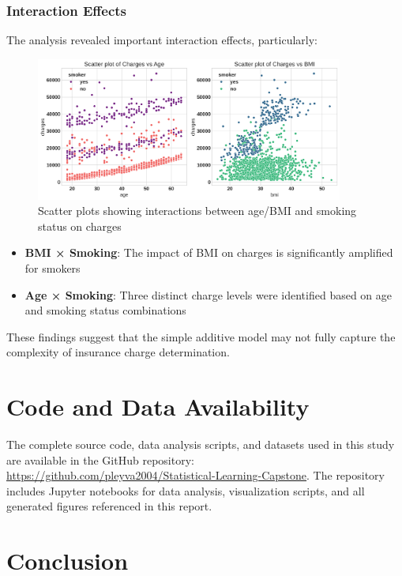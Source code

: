 \documentclass[12pt,a4paper]{article}
\begin{document}
\subsubsection{Interaction Effects}

The analysis revealed important interaction effects, particularly:

\begin{figure}[H]
\centering
\includegraphics[width=0.9\textwidth]{scatter_plots_charges_vs_age_bmi.png}
\caption{Scatter plots showing interactions between age/BMI and smoking status on charges}
\label{fig:scatter_plots_charges_vs_age_bmi}
\end{figure}

\begin{itemize}
    \item \textbf{BMI × Smoking}: The impact of BMI on charges is significantly amplified for smokers
    \item \textbf{Age × Smoking}: Three distinct charge levels were identified based on age and smoking status combinations
\end{itemize}

These findings suggest that the simple additive model may not fully capture the complexity of insurance charge determination.

\section{Code and Data Availability}

The complete source code, data analysis scripts, and datasets used in this study are available in the GitHub repository: \url{https://github.com/pleyva2004/Statistical-Learning-Capstone}. The repository includes Jupyter notebooks for data analysis, visualization scripts, and all generated figures referenced in this report.

\section{Conclusion}
\end{document}
